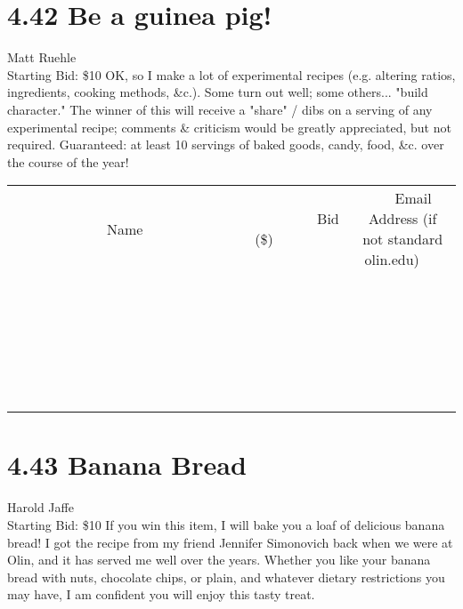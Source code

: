 \documentclass[11pt]{article}
\begin{document}
\section*{4.42 Be a guinea pig!}
Matt Ruehle
\\
Starting Bid: \$10
\newline
OK, so I make a lot of experimental recipes (e.g. altering ratios, ingredients, cooking methods, \&c.). Some turn out well; some others... "build character."
The winner of this will receive a "share" / dibs on a serving of any experimental recipe; comments \& criticism would be greatly appreciated, but not required.
Guaranteed: at least 10 servings of baked goods, candy, food, \&c. over the course of the year!
\\[6ex]
\begin{tabular}{c c c}
~~~~~~~~~~~~~Name~~~~~~~~~~~~~ & ~~~~~~~~~Bid (\$)~~~~~~~~~  & ~~~Email Address (if not standard olin.edu)~~~\\
 & & \\
\hline
 & & \\
\hline
 & & \\
\hline
 & & \\
\hline
 & & \\
\hline
 & & \\
\hline
 & & \\
\hline
 & & \\
\hline
 & & \\
\hline
 & & \\
\hline
 & & \\
\hline
 & & \\
\hline
 & & \\
\hline
 & & \\
\hline
 & & \\
\hline
 & & \\
\hline
 & & \\
\hline
 & & \\
\hline
 & & \\
\hline
 & & \\
\hline
 & & \\
\hline
 & & \\
\hline
 & & \\
\hline
 & & \\
\hline
 & & \\
\hline
 & & \\
\hline
\end{tabular}
\newpage
\section*{4.43 Banana Bread}
Harold Jaffe
\\
Starting Bid: \$10
\newline
If you win this item, I will bake you a loaf of delicious banana bread! I got the recipe from my friend Jennifer Simonovich back when we were at Olin, and it has served me well over the years. Whether you like your banana bread with nuts, chocolate chips, or plain, and whatever dietary restrictions you may have, I am confident you will enjoy this tasty treat.
\end{document}
